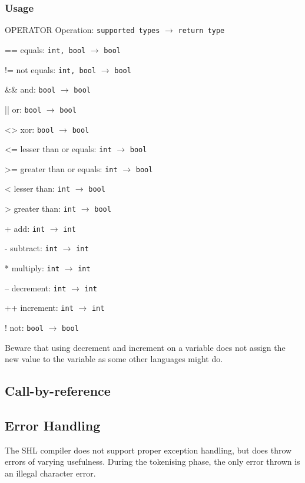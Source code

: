 \documentclass[twoside]{report}
\newenvironment{mycompactdesc}{\begin{adjustwidth}{0.53cm}{}\begin{compactdesc}}{\end{compactdesc}\end{adjustwidth}}
\begin{document}
\subsubsection*{Usage}
\begin{mycompactdesc}
	\item[OPERATOR] Operation: \texttt{supported types} $\rightarrow$ \texttt{return type}
	\item[==] equals: \texttt{int, bool} $\rightarrow$ \texttt{bool}
	\item[!=] not equals: \texttt{int, bool} $\rightarrow$ \texttt{bool}
	\item[\&\&] and: \texttt{bool} $\rightarrow$ \texttt{bool}
	\item[||] or: \texttt{bool} $\rightarrow$ \texttt{bool}
	\item[<>] xor: \texttt{bool} $\rightarrow$ \texttt{bool}
	\item[<=] lesser than or equals: \texttt{int} $\rightarrow$ \texttt{bool}
	\item[>=] greater than or equals: \texttt{int} $\rightarrow$ \texttt{bool}
	\item[<] lesser than: \texttt{int} $\rightarrow$ \texttt{bool}
	\item[>] greater than: \texttt{int} $\rightarrow$ \texttt{bool}
	\item[+] add: \texttt{int} $\rightarrow$ \texttt{int}
	\item[-] subtract: \texttt{int} $\rightarrow$ \texttt{int}
	\item[*] multiply: \texttt{int} $\rightarrow$ \texttt{int}
	\item[--] decrement: \texttt{int} $\rightarrow$ \texttt{int}
	\item[++] increment: \texttt{int} $\rightarrow$ \texttt{int}
	\item[!] not: \texttt{bool} $\rightarrow$ \texttt{bool}
\end{mycompactdesc}
Beware that using decrement and increment on a variable does not assign the new value to the variable as some other languages might do.


\subsection{Call-by-reference}
\label{def:call-by-refence}


\subsection{Error Handling}
\label{def:error_handling}
The SHL compiler does not support proper exception handling, but does throw errors of varying usefulness. During the tokenising phase, the only error thrown is an illegal character error.
\end{document}
